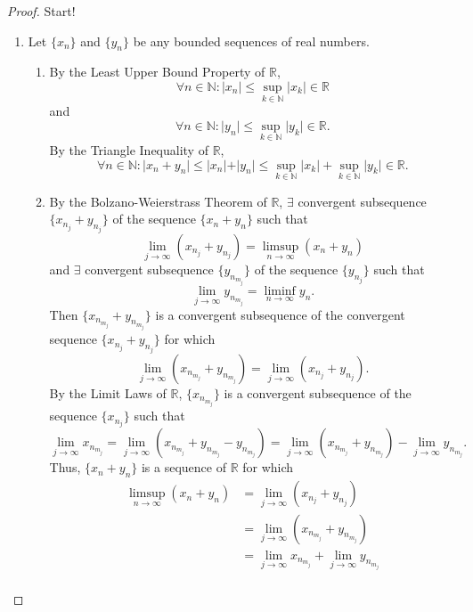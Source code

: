\documentclass[12pt]{article}
\theoremstyle{definition}
\begin{document}
\begin{proof}
    Start!
    \begin{enumerate}[label=(\alph*)]
        \item Let \(\{x_n\}\) and \(\{y_n\}\) be any bounded sequences of real numbers.
        \begin{enumerate}[label=(\roman*)]
            \item By the Least Upper Bound Property of \(\mathbb{R}\),
            \[
                \forall n \in \mathbb{N} : \vert x_n \vert \leq \sup_{k \in \mathbb{N}}\vert x_k \vert \in \mathbb{R}
            \]
            and
            \[
                \forall n \in \mathbb{N} : \vert y_n \vert \leq \sup_{k \in \mathbb{N}}\vert y_k \vert \in \mathbb{R}.
            \]
            By the Triangle Inequality of \(\mathbb{R}\), 
            \[
                \forall n \in \mathbb{N} : \vert x_n + y_n \vert \leq \vert x_n \vert + \vert y_n \vert \leq \sup_{k \in \mathbb{N}}\vert x_k \vert + \sup_{k \in \mathbb{N}}\vert y_k \vert \in \mathbb{R}.
            \]
            \item By the Bolzano-Weierstrass Theorem of $\mathbb{R}$, $\exists$ convergent subsequence $\{x_{n_j} + y_{n_j}\}$ of the sequence $\{x_n + y_n\}$ such that
        \[
            \lim_{j \to \infty}(x_{n_j} + y_{n_j}) = \limsup_{n \to \infty}(x_n + y_n)
        \]
        and $\exists$ convergent subsequence $\{y_{n_{m_j}}\}$ of the sequence $\{y_{n_j}\}$ such that
        \[
            \lim_{j \to \infty}y_{n_{m_j}} = \liminf_{n \to \infty}y_n.
        \]
        Then $\{x_{n_{m_j}} + y_{n_{m_j}}\}$ is a convergent subsequence of the convergent sequence $\{x_{n_j} + y_{n_j}\}$ for which
        \[
            \lim_{j \to \infty}(x_{n_{m_j}} + y_{n_{m_j}}) = \lim_{j \to \infty}(x_{n_j} + y_{n_j}).
        \]
        By the Limit Laws of $\mathbb{R}$, $\{x_{n_{m_j}}\}$ is a convergent subsequence of the sequence $\{x_{n_j}\}$ such that
        \[
            \lim_{j \to \infty}x_{n_{m_j}} = \lim_{j \to \infty}(x_{n_{m_j}} + y_{n_{m_j}} - y_{n_{m_j}}) = \lim_{j \to \infty}(x_{n_{m_j}} + y_{n_{m_j}}) - \lim_{j \to \infty}y_{n_{m_j}}.
        \]
        Thus, $\{x_n + y_n\}$ is a sequence of $\mathbb{R}$ for which
        \begin{align*}
            \limsup_{n \to \infty}(x_n + y_n) &= \lim_{j \to \infty}(x_{n_j} + y_{n_j}) \\
            &= \lim_{j \to \infty}(x_{n_{m_j}} + y_{n_{m_j}}) \\ 
            &= \lim_{j \to \infty}x_{n_{m_j}} + \lim_{j \to \infty}y_{n_{m_j}} \\

\end{align*}
\end{enumerate}
\end{enumerate}
\end{proof}
\end{document}
